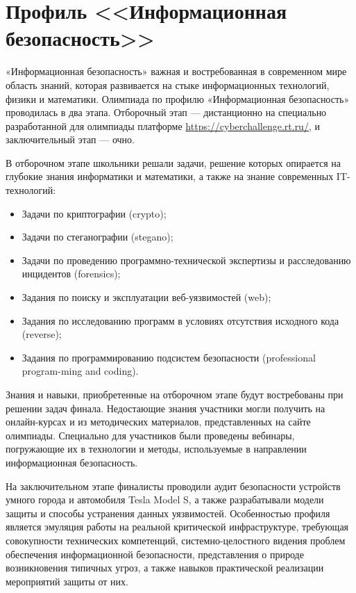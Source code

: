

\chapter{Профиль <<Информационная безопасность>>}

«Информационная безопасность» важная и востребованная в современном мире область знаний, которая развивается на стыке информационных технологий, физики и математики. Олимпиада по профилю «Информационная безопасность» проводилась в два этапа. Отборочный этап — дистанционно на специально разработанной для олимпиады платформе \url{https://cyberchallenge.rt.ru/}, и заключительный этап — очно. 

В отборочном этапе школьники решали задачи, решение которых опирается на глубокие знания информатики и математики, а также на знание современных IT-технологий:
\begin{itemize}    
    \item Задачи по криптографии (crypto);
    \item Задачи по стеганографии (stegano);
    \item Задачи по проведению программно-технической экспертизы и расследованию инцидентов (forensics);
    \item Задания по поиску и эксплуатации веб-уязвимостей (web);
    \item Задания по исследованию программ в условиях отсутствия исходного кода (reverse);
    \item Задания по программированию подсистем безопасности (professional program-ming and coding).
\end{itemize}    

Знания и навыки, приобретенные на отборочном этапе будут востребованы при решении задач финала. Недостающие знания участники могли получить на онлайн-курсах и из методических материалов, представленных на сайте олимпиады. Специально для участников были проведены вебинары, погружающие их в технологии и методы, используемые в направлении информационная безопасность. 

На заключительном этапе финалисты проводили аудит безопасности устройств умного города и автомобиля Tesla Model S, а также разрабатывали модели защиты и способы устранения данных уязвимостей. Особенностью профиля является эмуляция работы на реальной критической инфраструктуре, требующая совокупности технических компетенций, системно-целостного видения проблем обеспечения информационной безопасности, представления о природе возникновения типичных угроз, а также навыков практической реализации мероприятий защиты от них.